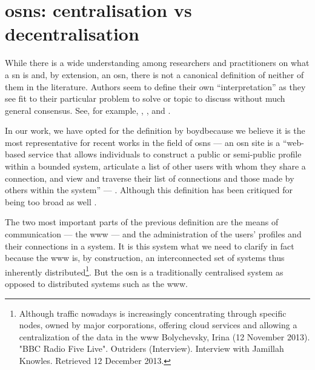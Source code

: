 \documentclass[showtrims]{kthesis}
\begin{document}
\section{\Aclp{osn}: centralisation vs decentralisation}

While there is a wide understanding among researchers and practitioners on what 
a \ac{sn} is and, by extension, an \ac{osn}, there is not a canonical definition 
of neither of them in the literature. Authors seem to define their own ``interpretation'' 
as they see fit to their particular problem to solve or topic to discuss without 
much general consensus. See, for example, \cite{AdamicA05}, \cite{DwyerHP07}, \cite{SchneiderFKW09} 
and \cite{RichterRB11}.

In our work, we have opted for the definition by boyd\etal because we 
believe it is the most representative for recent works in the field of \acp{osn} 
--- an \ac{osn} site is a ``web-based service that allows individuals to construct 
a public or semi-public profile within a bounded system, articulate a list of other 
users with whom they share a connection, and view and traverse their list of connections 
and those made by others within the system'' --- \cite{boydE07}. Although this definition 
has been critiqued for being too broad as well \cite{Beer08}.

The two most important parts of the previous definition are the means of communication 
--- the \ac{www} --- and the administration of the users' profiles and their connections 
in a system. It is this system what we need to clarify in fact because the \ac{www} 
is, by construction, an interconnected set of systems thus inherently distributed\footnote{
Although \Internet traffic nowadays is increasingly concentrating through specific 
nodes, owned by major corporations, offering cloud services and allowing a centralization 
of the data in the \ac{www} Bolychevsky, Irina (12 November 2013). "BBC Radio Five Live". Outriders (Interview). Interview with Jamillah Knowles. Retrieved 12 December 2013.}. 
But the \ac{osn} is a traditionally centralised system as opposed to distributed 
systems such as the \ac{www}.

\end{document}
